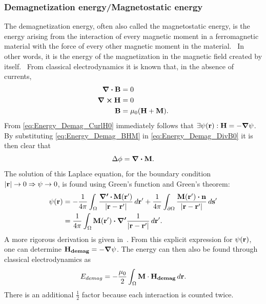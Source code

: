 \documentclass[12pt,a4paper]{article}
\begin{document}
\subsubsection{Demagnetization energy/Magnetostatic energy}
The demagnetization energy, often also called the magnetostatic energy, is the energy arising from the interaction of every magnetic moment in a ferromagnetic material with the force of every other magnetic moment in the material.~\cite{NML_Carlton} In other words, it is the energy of the magnetization in the magnetic field created by itself.~\cite{abert2013discrete}
From classical electrodynamics it is known that, in the absence of currents,
\begin{align}
	\div{\vb{B}} &= 0 \label{eq:Energy_Demag_DivB0} \\
	\curl{\vb{H}} &= 0 \label{eq:Energy_Demag_CurlH0} \\
	\vb{B} &= \mu_0 (\vb{H} + \vb{M}) \label{eq:Energy_Demag_BHM} \mathrm{.}
\end{align}
From \cref{eq:Energy_Demag_CurlH0} immediately follows that $\exists \psi(\vb{r}): \vb{H} = -\gradient{\psi}$. By substituting \cref{eq:Energy_Demag_BHM} in \cref{eq:Energy_Demag_DivB0} it is then clear that
\begin{equation}
    \Delta \phi = \div{\vb{M}} \mathrm{.}
\end{equation}
The solution of this Laplace equation, for the boundary condition $\abs{\vb{r}} \rightarrow 0 \Rightarrow \psi \rightarrow 0$, is found using Green's function and Green's theorem:
\begin{align*}
    \psi(\vb{r}) &= -\frac{1}{4\pi}\int_\Omega \frac{\boldsymbol{\nabla'\,\vdot}\,\vb{M}(\vb{r'})}{\abs{\vb{r}-\vb{r'}}} \,d\vb{r'} + \frac{1}{4\pi}\int_{\partial\Omega} \frac{\vb{M}(\vb{r'}) \vdot \vb{n}}{\abs{\vb{r}-\vb{r'}}} \,d\vb{s'} \\
    &= \frac{1}{4\pi}\int_\Omega \vb{M}(\vb{r'}) \vdot \boldsymbol{\nabla'} \frac{1}{\abs{\vb{r}-\vb{r'}}} \,d\vb{r'} \mathrm{.}
\end{align*}
A more rigorous derivation is given in~\cite{abert2013discrete}.
From this explicit expression for $\psi(\vb{r})$, one can determine $\vb{H_{demag}} = -\gradient{\psi}$. The energy can then also be found through classical electrodynamics as
\begin{equation}
    E_{demag} = -\frac{\mu_0}{2} \int_\Omega \vb{M} \cdot \vb{H_{demag}} \, d\vb{r} \mathrm{.} \label{eq:Energy_Term_Demag}
\end{equation}
There is an additional $\frac{1}{2}$ factor because each interaction is counted twice.
\end{document}

